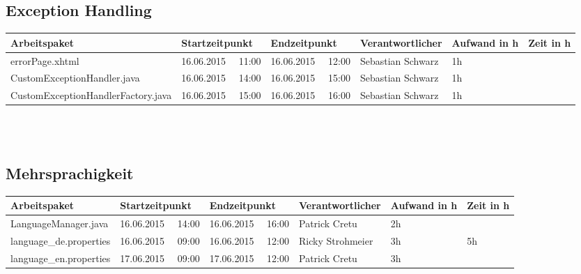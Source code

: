 \begin{landscape}
	\subsection{Exception Handling}
	\begin{tabular}{|p{10.3cm}|p{3.2cm}|p{3.2cm}|p{3.5cm}|p{1.7cm}|p{1.5cm}|}
		\hline  \textbf{Arbeitspaket} & \textbf{Startzeitpunkt} & \textbf{Endzeitpunkt} & \textbf{Verantwortlicher}  & \textbf{Aufwand in h} & \textbf{Zeit in h}\\ 
		\hline   errorPage.xhtml                                        & 16.06.2015 \ \ 11:00       & 16.06.2015 \ \ 12:00        & Sebastian Schwarz & 1h                 & \\  
		\hline   CustomExceptionHandler.java                            & 16.06.2015 \ \ 14:00       & 16.06.2015 \ \ 15:00       & Sebastian Schwarz & 1h                 & \\  
		\hline   CustomExceptionHandlerFactory.java                     & 16.06.2015 \ \ 15:00       & 16.06.2015 \ \ 16:00       & Sebastian Schwarz  & 1h                 &\\  
		\hline 
	\end{tabular} \ \\
	\ \\	
	
	\subsection{Mehrsprachigkeit}
	\begin{tabular}{|p{10.3cm}|p{3.2cm}|p{3.2cm}|p{3.5cm}|p{1.7cm}|p{1.5cm}|}
		\hline  \textbf{Arbeitspaket} & \textbf{Startzeitpunkt} & \textbf{Endzeitpunkt} & \textbf{Verantwortlicher}  & \textbf{Aufwand in h} & \textbf{Zeit in h}\\ 
		\hline   LanguageManager.java                                  & 16.06.2015 \ \ 14:00        & 16.06.2015 \ \ 16:00       & Patrick Cretu  &  2h                 & \\ 
		\hline   language\_de.properties                               & 16.06.2015 \ \ 09:00        & 16.06.2015 \ \ 12:00       & Ricky Strohmeier &  3h    & 5h \\
		\hline   language\_en.properties                               & 17.06.2015 \ \ 09:00        & 17.06.2015 \ \ 12:00       & Patrick Cretu  &  3h                 & \\ 
		\hline 
	\end{tabular} \ \\
	\ \\
	

\end{landscape}
